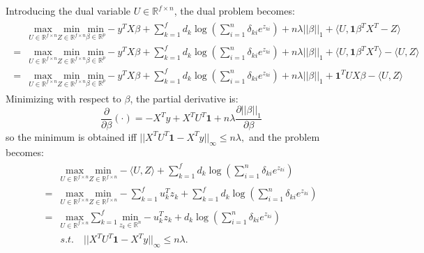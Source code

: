 Introducing the dual variable $U\in\mathbb{R}^{f\times n}$, the dual problem becomes:
\begin{gather}
    \label{eq:dual+u}
    \begin{aligned}
        &\underset{U\in \mathbb{R}^{f\times n}}{\mathrm{max}}\underset{Z\in \mathbb{R}^{f\times n}}{\mathrm{min}}\underset{\beta\in \mathbb{R}^p}{\mathrm{min}}-y^TX\beta+\sum_{k=1}^f d_k\log\left(\sum_{i=1}^n \delta_{ki} e^{z_{ki}}\right)+n\lambda||\beta||_1+\langle U,\mathbf{1}\beta^TX^T-Z\rangle\\
        =&\underset{U\in \mathbb{R}^{f\times n}}{\mathrm{max}}\underset{Z\in \mathbb{R}^{f\times n}}{\mathrm{min}}\underset{\beta\in \mathbb{R}^p}{\mathrm{min}}-y^TX\beta+\sum_{k=1}^f d_k\log\left(\sum_{i=1}^n \delta_{ki} e^{z_{ki}}\right)+n\lambda||\beta||_1+\langle U,\mathbf{1}\beta^TX^T\rangle-\langle U,Z\rangle\\
        =&\underset{U\in \mathbb{R}^{f\times n}}{\mathrm{max}}\underset{Z\in \mathbb{R}^{f\times n}}{\mathrm{min}}\underset{\beta\in \mathbb{R}^p}{\mathrm{min}}-y^TX\beta+\sum_{k=1}^f d_k\log\left(\sum_{i=1}^n \delta_{ki} e^{z_{ki}}\right)+n\lambda||\beta||_1+\mathbf{1}^TUX\beta-\langle U,Z\rangle
    \end{aligned}    
\end{gather}
Minimizing with respect to $\beta$, the partial derivative is:
\begin{equation}
    \label{eq:partialbeta}
    \frac{\partial}{\partial\beta}(\cdot) =-X^Ty+X^TU^T\mathbf{1}+n\lambda\frac{\partial||\beta||_1}{\partial\beta}
\end{equation}
so the minimum is obtained iff $||X^TU^T\mathbf{1}-X^Ty||_\infty\leq n\lambda,$ and the problem becomes:
\begin{gather}
    \label{eq:dual-beta}
    \begin{aligned}
        &\underset{U\in \mathbb{R}^{f\times n}}{\mathrm{max}}\underset{Z\in \mathbb{R}^{f\times n}}{\mathrm{min}}- \langle U,Z\rangle+\sum_{k=1}^f d_k\log\left(\sum_{i=1}^n \delta_{ki} e^{z_{ki}}\right)\\
        =&\underset{U\in \mathbb{R}^{f\times n}}{\mathrm{max}}\underset{Z\in \mathbb{R}^{f\times n}}{\mathrm{min}}-\sum_{k=1}^f u_k^Tz_k +\sum_{k=1}^f d_k\log\left(\sum_{i=1}^n \delta_{ki} e^{z_{ki}}\right)\\
        =&\underset{U\in \mathbb{R}^{f\times n}}{\mathrm{max}}\sum_{k=1}^f\underset{z_k\in \mathbb{R}^n}{\mathrm{min}}-u_k^Tz_k+d_k\log\left(\sum_{i=1}^n \delta_{ki} e^{z_{ki}}\right)\\
        &s.t.\quad ||X^TU^T\mathbf{1}-X^Ty||_\infty\leq n\lambda.
    \end{aligned}
\end{gather}
